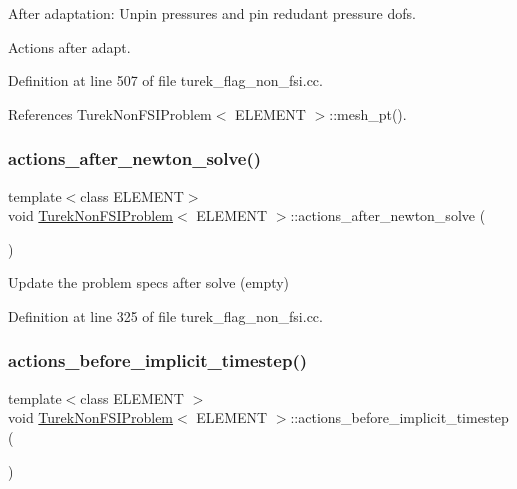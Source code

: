 After adaptation\+: Unpin pressures and pin redudant pressure dofs. 

Actions after adapt. 

Definition at line 507 of file turek\+\_\+flag\+\_\+non\+\_\+fsi.\+cc.



References Turek\+Non\+F\+S\+I\+Problem$<$ E\+L\+E\+M\+E\+N\+T $>$\+::mesh\+\_\+pt().

\mbox{\label{classTurekNonFSIProblem_a161cfe46817a5129dcc33c7ce3a17173}} 
\subsubsection{\texorpdfstring{actions\+\_\+after\+\_\+newton\+\_\+solve()}{actions\_after\_newton\_solve()}}
{\footnotesize\ttfamily template$<$class E\+L\+E\+M\+E\+NT$>$ \\
void \hyperlink{classTurekNonFSIProblem}{Turek\+Non\+F\+S\+I\+Problem}$<$ E\+L\+E\+M\+E\+NT $>$\+::actions\+\_\+after\+\_\+newton\+\_\+solve (\begin{DoxyParamCaption}{ }\end{DoxyParamCaption})\hspace{0.3cm}{\ttfamily [inline]}}



Update the problem specs after solve (empty) 



Definition at line 325 of file turek\+\_\+flag\+\_\+non\+\_\+fsi.\+cc.

\mbox{\label{classTurekNonFSIProblem_a29725cde9071c3a83792469787ea6c7d}} 
\subsubsection{\texorpdfstring{actions\+\_\+before\+\_\+implicit\+\_\+timestep()}{actions\_before\_implicit\_timestep()}}
{\footnotesize\ttfamily template$<$class E\+L\+E\+M\+E\+NT $>$ \\
void \hyperlink{classTurekNonFSIProblem}{Turek\+Non\+F\+S\+I\+Problem}$<$ E\+L\+E\+M\+E\+NT $>$\+::actions\+\_\+before\+\_\+implicit\+\_\+timestep (\begin{DoxyParamCaption}{ }\end{DoxyParamCaption})}



